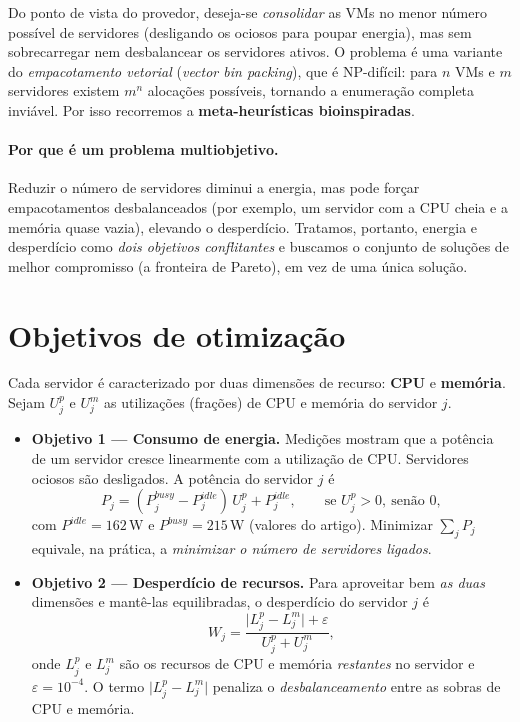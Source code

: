 \documentclass[11pt]{article}
\begin{document}
Do ponto de vista do provedor, deseja-se \emph{consolidar} as VMs no menor número
possível de servidores (desligando os ociosos para poupar energia), mas sem
sobrecarregar nem desbalancear os servidores ativos. O problema é uma variante do
\emph{empacotamento vetorial} (\emph{vector bin packing}), que é NP-difícil:
para $n$ VMs e $m$ servidores existem $m^{n}$ alocações possíveis, tornando a
enumeração completa inviável. Por isso recorremos a \textbf{meta-heurísticas
bioinspiradas}.

\paragraph{Por que é um problema multiobjetivo.} Reduzir o número de servidores
diminui a energia, mas pode forçar empacotamentos desbalanceados (por exemplo, um
servidor com a CPU cheia e a memória quase vazia), elevando o desperdício.
Tratamos, portanto, energia e desperdício como \emph{dois objetivos
conflitantes} e buscamos o conjunto de soluções de melhor compromisso (a
fronteira de Pareto), em vez de uma única solução.

\section{Objetivos de otimização}
Cada servidor é caracterizado por duas dimensões de recurso: \textbf{CPU} e
\textbf{memória}. Sejam $U^{p}_{j}$ e $U^{m}_{j}$ as utilizações (frações)
de CPU e memória do servidor $j$.

\begin{itemize}[leftmargin=1.4em]
  \item \textbf{Objetivo 1 --- Consumo de energia.} Medições mostram que a
  potência de um servidor cresce linearmente com a utilização de CPU. Servidores
  ociosos são desligados. A potência do servidor $j$ é
  \begin{equation}
    P_{j} = (P^{busy}_{j}-P^{idle}_{j})\,U^{p}_{j} + P^{idle}_{j},
    \qquad \text{se } U^{p}_{j}>0,\ \text{senão } 0,
    \label{eq:pot}
  \end{equation}
  com $P^{idle}=162$\,W e $P^{busy}=215$\,W (valores do artigo). Minimizar
  $\sum_j P_j$ equivale, na prática, a \emph{minimizar o número de servidores
  ligados}.

  \item \textbf{Objetivo 2 --- Desperdício de recursos.} Para aproveitar bem
  \emph{as duas} dimensões e mantê-las equilibradas, o desperdício do servidor
  $j$ é
  \begin{equation}
    W_{j} = \frac{\lvert L^{p}_{j}-L^{m}_{j}\rvert + \varepsilon}
                 {U^{p}_{j}+U^{m}_{j}},
    \label{eq:desp}
  \end{equation}
  onde $L^{p}_{j}$ e $L^{m}_{j}$ são os recursos de CPU e memória
  \emph{restantes} no servidor e $\varepsilon=10^{-4}$. O termo
  $\lvert L^{p}_{j}-L^{m}_{j}\rvert$ penaliza o \emph{desbalanceamento} entre as
  sobras de CPU e memória.
\end{itemize}
\end{document}
